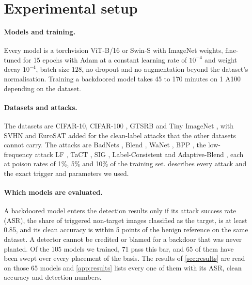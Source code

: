 \section{Experimental setup}
\label{sec:setup}

\paragraph{Models and training.}
Every model is a torchvision \cite{paszke2019pytorch} ViT-B/16 or Swin-S with ImageNet weights, fine-tuned for 15 epochs with Adam \cite{kingma2015adam} at a constant learning rate of $10^{-4}$ and weight decay $10^{-4}$, batch size 128, no dropout and no augmentation beyond the dataset's normalisation. Training a backdoored model takes 45 to 170 minutes on 1 A100 depending on the dataset.

\paragraph{Datasets and attacks.}
The datasets are CIFAR-10, CIFAR-100 \cite{krizhevsky2009cifar}, GTSRB \cite{stallkamp2012gtsrb} and Tiny ImageNet \cite{le2015tiny}, with SVHN \cite{netzer2011svhn} and EuroSAT \cite{helber2019eurosat} added for the clean-label attacks that the other datasets cannot carry. The attacks are BadNets \cite{gu2017badnets}, Blend \cite{chen2017targeted}, WaNet \cite{nguyen2021wanet}, BPP \cite{wang2022bpp}, the low-frequency attack LF \cite{zeng2021lf}, TaCT \cite{tang2021demon}, SIG \cite{barni2019sig}, Label-Consistent \cite{turner2019label} and Adaptive-Blend \cite{qi2023adaptive}, each at poison rates of 1\%, 5\% and 10\% of the training set.  describes every attack and the exact trigger and parameters we used.

\paragraph{Which models are evaluated.}
A backdoored model enters the detection results only if its attack success rate (ASR), the share of triggered non-target images classified as the target, is at least 0.85, and its clean accuracy is within 5 points of the benign reference on the same dataset. A detector cannot be credited or blamed for a backdoor that was never planted. Of the 105 models we trained, 71 pass this bar, and 65 of them have been swept over every placement of the basis. The results of \cref{sec:results} are read on those 65 models and \cref{app:results} lists every one of them with its ASR, clean accuracy and detection numbers.

